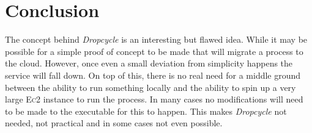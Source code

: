 \documentclass[12pt, a4paper]{article}
\begin{document}



\section{Conclusion}

The concept behind \emph{Dropcycle} is an interesting but flawed idea. While it
may be possible for a simple proof of concept to be made that will migrate
a process to the cloud. However, once even a small deviation from simplicity
happens the service will fall down. On top of this, there is no real need for
a middle ground between the ability to run something locally and the ability to
spin up a very large \textsc{Ec2} instance to run the process. In many cases no
modifications will need to be made to the executable for this to happen. This
makes \emph{Dropcycle} not needed, not practical and in some cases not even
possible.

{}

\end{document}
